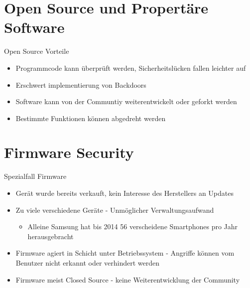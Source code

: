 \documentclass[10pt]{beamer}
\begin{document}

\section{Open Source und Propert\"are Software}

\begin{frame}[fragile]{Open Source Vorteile}
  \begin{itemize}
    \item Programmcode kann \"uberpr\"uft werden, Sicherheitsl\"ucken fallen leichter auf
    \item Erschwert implementierung von Backdoors
    \item Software kann von der Communtiy weiterentwickelt oder geforkt werden
    \item Bestimmte Funktionen k\"onnen abgedreht werden
  \end{itemize}
\end{frame}


\section{Firmware Security}
\begin{frame}[fragile]{Spezialfall Firmware}
  \begin{itemize}
    \item Ger\"at wurde bereits verkauft, kein Interesse des Herstellers an Updates
    \item Zu viele verschiedene Ger\"ate - Unm\"oglicher Verwaltungsaufwand
      \begin{itemize}
        \item Alleine Samsung hat bis 2014 56 verscheidene Smartphones pro Jahr herausgebracht
      \end{itemize}
    \item Firmware agiert in Schicht unter Betriebssystem - Angriffe k\"onnen vom Benutzer nicht erkannt oder verhindert werden
    \item Firmware meist Closed Source - keine Weiterentwicklung der Community
  \end{itemize}
\end{frame}
\end{document}
